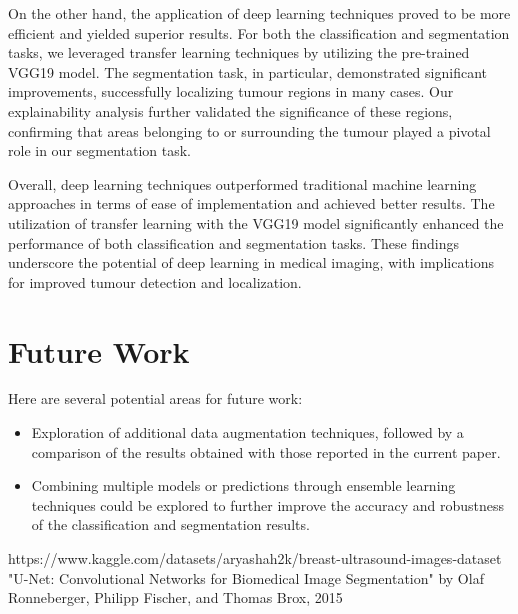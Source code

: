 On the other hand, the application of deep learning techniques proved to be more efficient and yielded superior results. For both the classification and segmentation tasks, we leveraged transfer learning techniques by utilizing the pre-trained VGG19 model. The segmentation task, in particular, demonstrated significant improvements, successfully localizing tumour regions in many cases. Our explainability analysis further validated the significance of these regions, confirming that areas belonging to or surrounding the tumour played a pivotal role in our segmentation task.

Overall, deep learning techniques outperformed traditional machine learning approaches in terms of ease of implementation and achieved better results. The utilization of transfer learning with the VGG19 model significantly enhanced the performance of both classification and segmentation tasks. These findings underscore the potential of deep learning in medical imaging, with implications for improved tumour detection and localization.

\section{Future Work}
Here are several potential areas for future work:
\begin{itemize}
\item Exploration of additional data augmentation techniques, followed by a comparison of the results obtained with those reported in the current paper.
\item Combining multiple models or predictions through ensemble learning techniques could be explored to further improve the accuracy and robustness of the classification and segmentation results.
\end{itemize}

\begin{thebibliography}{00}
 https://www.kaggle.com/datasets/aryashah2k/breast-ultrasound-images-dataset
 "U-Net: Convolutional Networks for Biomedical Image Segmentation" by Olaf Ronneberger, Philipp Fischer, and Thomas Brox, 2015
\end{thebibliography}
\vspace{12pt}
\color{red}